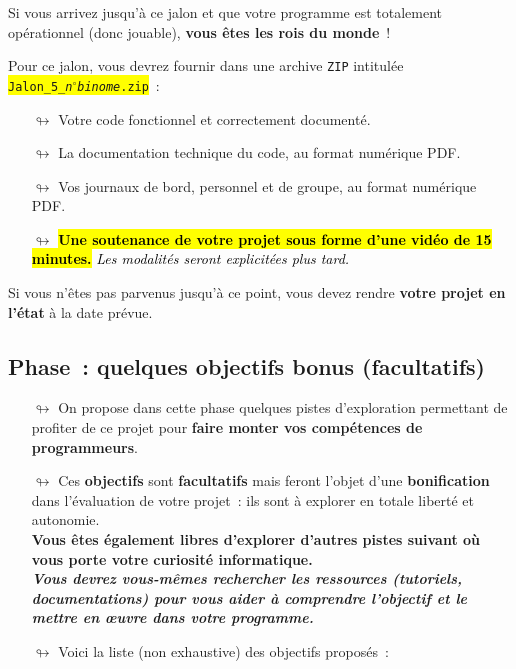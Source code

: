 \documentclass[10pt, fleqn, a4paper]{article}
\newcommand{\bfcolor}[2]{\textcolor{#1}{\textbf{#2}}}
\newcommand{\itcolor}[2]{\textcolor{#1}{\textit{#2}}}
\newcommand\myframecolor{}
\newcommand\mybgcolor{}
\newenvironment{mycolorbox}[2]
{
\def\myframecolor{#1}
\def\mybgcolor{#2}
\begingroup
\begin{lrbox}{\mytextbox}
\begin{minipage}[t]{\textwidth}
}
{
\end{minipage}\end{lrbox}
\fcolorbox{\myframecolor}{\mybgcolor}{\usebox{\mytextbox}}
\endgroup
}
\newcounter{quest}
\begin{document}
\begin{mycolorbox}{black}{orange}
Si vous arrivez jusqu'à ce jalon et que votre programme est totalement opérationnel (donc \og{}jouable\fg{}), \textbf{vous êtes les rois du monde}~!

Pour ce jalon, vous devrez fournir dans une archive \texttt{ZIP} intitulée\\ \colorbox{yellow}{\texttt{Jalon\_5\_\textit{n$^\circ$binome}.zip}}~:
\begin{itemize}
\item[$\looparrowright$] Votre code fonctionnel et correctement documenté.
\item[$\looparrowright$] La documentation technique du code, au format numérique PDF.
\item[$\looparrowright$] Vos journaux de bord, personnel et de groupe, au format numérique PDF.
\item[$\looparrowright$] \colorbox{yellow}{\bfcolor{black}{Une soutenance de votre projet sous forme d'une vidéo de 15 minutes.}} \itcolor{black}{Les modalités seront explicitées plus tard.}
\end{itemize}
\begin{mycolorbox}{black}{yellow}Si vous n'êtes pas parvenus jusqu'à ce point, vous devez rendre \textbf{votre projet en l'état} à la date prévue.\end{mycolorbox}
\end{mycolorbox}

\addtocounter{quest}{1}
\subsection*{Phase~\thequest : quelques objectifs bonus (facultatifs)}
\label{phase_objectifs_bonus}

\begin{itemize}
\item[$\looparrowright$] On propose dans cette phase quelques pistes d'exploration permettant de profiter de ce projet pour  \bfcolor{redCM}{faire monter vos compétences de programmeurs}.
\item[$\looparrowright$] Ces \bfcolor{redCM}{objectifs} sont \bfcolor{redCM}{facultatifs} mais feront l'objet d'une \bfcolor{redCM}{bonification} dans l'évaluation de votre projet~: ils sont à explorer en totale liberté et autonomie.\\ \bfcolor{blueTD}{Vous êtes également libres d'explorer d'autres pistes suivant où vous porte votre curiosité \og{}informatique\fg{}.}\\
\itcolor{redCM}{\bf Vous devrez vous-mêmes rechercher les ressources (tutoriels, documentations) pour vous aider à comprendre l'objectif et le mettre en œuvre dans votre programme.}
\item[$\looparrowright$] Voici la liste (non exhaustive) des objectifs proposés~:
\end{itemize}
\end{document}
